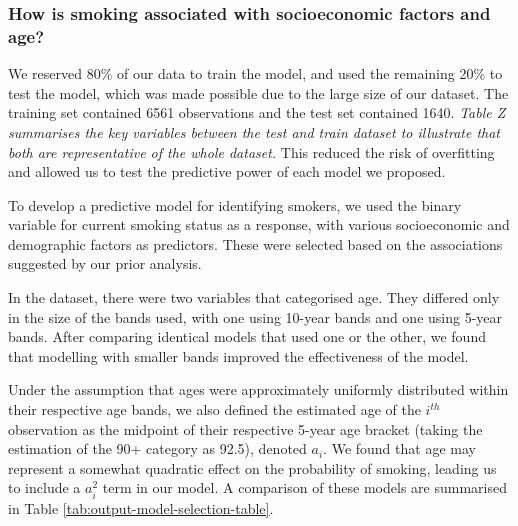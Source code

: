 \documentclass[
  11pt,
  twocolumn]{article}
\begin{document}
\hypertarget{how-is-smoking-associated-with-socioeconomic-factors-and-age}{%
\subsubsection{How is smoking associated with socioeconomic factors and
age?}\label{how-is-smoking-associated-with-socioeconomic-factors-and-age}}

We reserved 80\% of our data to train the model, and used the remaining
20\% to test the model, which was made possible due to the large size of
our dataset. The training set contained 6561 observations and the test
set contained 1640. \emph{Table Z summarises the key variables between
the test and train dataset to illustrate that both are representative of
the whole dataset.} This reduced the risk of overfitting and allowed us
to test the predictive power of each model we proposed.

To develop a predictive model for identifying smokers, we used the
binary variable for current smoking status as a response, with various
socioeconomic and demographic factors as predictors. These were selected
based on the associations suggested by our prior analysis.

In the dataset, there were two variables that categorised age. They
differed only in the size of the bands used, with one using 10-year
bands and one using 5-year bands. After comparing identical models that
used one or the other, we found that modelling with smaller bands
improved the effectiveness of the model.

Under the assumption that ages were approximately uniformly distributed
within their respective age bands, we also defined the estimated age of
the \(i^{th}\) observation as the midpoint of their respective 5-year
age bracket (taking the estimation of the 90+ category as 92.5), denoted
\(a_i\). We found that age may represent a somewhat quadratic effect on
the probability of smoking, leading us to include a \(a_i^2\) term in
our model. A comparison of these models are summarised in Table
\ref{tab:output-model-selection-table}.
\end{document}
